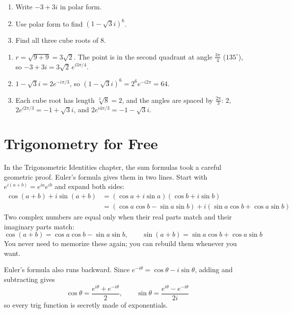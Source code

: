 \begin{Exercise}[title={Polar Form}, label=eu_polar]
\begin{enumerate}
\item Write $-3 + 3i$ in polar form.
\item Use polar form to find $(1 - \sqrt{3}i)^6$.
\item Find all three cube roots of 8.
\end{enumerate}
\end{Exercise}
\begin{Answer}[ref=eu_polar]
\begin{enumerate}
\item $r = \sqrt{9 + 9} = 3\sqrt{2}$. The point is in the second quadrant at angle
$\frac{3\pi}{4}$ ($135^\circ$), so $-3 + 3i = 3\sqrt{2}\,e^{i3\pi/4}$.
\item $1 - \sqrt{3}i = 2e^{-i\pi/3}$, so $(1 - \sqrt{3}i)^6 = 2^6 e^{-i2\pi} = 64$.
\item Each cube root has length $\sqrt[3]{8} = 2$, and the angles are spaced by
$\frac{2\pi}{3}$: $2$, $2e^{i2\pi/3} = -1 + \sqrt{3}i$, and $2e^{i4\pi/3} = -1 - \sqrt{3}i$.
\end{enumerate}
\end{Answer}

\section{Trigonometry for Free}
In the Trigonometric Identities chapter, the sum formulas took a careful geometric
proof. Euler's formula gives them in two lines. Start with
$e^{i(a+b)} = e^{ia}e^{ib}$ and expand both sides:
\begin{align*}
\cos(a+b) + i\sin(a+b) &= (\cos a + i\sin a)(\cos b + i\sin b) \\
&= (\cos a\cos b - \sin a\sin b) + i(\sin a\cos b + \cos a\sin b)
\end{align*}
Two complex numbers are equal only when their real parts match and their imaginary
parts match:
$$\cos(a+b) = \cos a\cos b - \sin a\sin b, \qquad \sin(a+b) = \sin a\cos b + \cos a\sin b$$
You never need to memorize these again; you can rebuild them whenever you want.

Euler's formula also runs backward. Since $e^{-i\theta} = \cos\theta - i\sin\theta$,
adding and subtracting gives
$$\cos\theta = \frac{e^{i\theta} + e^{-i\theta}}{2}, \qquad \sin\theta = \frac{e^{i\theta} - e^{-i\theta}}{2i}$$
so every trig function is secretly made of exponentials.

